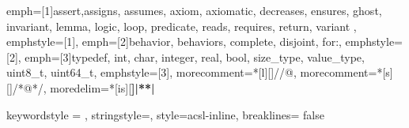 {	emph=[1]{assert,assigns, assumes, axiom, axiomatic, decreases, ensures, ghost, invariant, lemma, logic, loop,
             predicate, reads, requires, return, variant },
	emphstyle=[1]{\bfseries\color{coASCLKeyword}},
	emph=[2]{behavior, behaviors, complete, disjoint, for:},
	emphstyle=[2]{\bfseries\color{coACSLBehavior}},
	emph=[3]{typedef, int, char, integer, real, bool, size_type, value_type, uint8_t,  uint64_t},
	emphstyle=[3]{\bfseries\color{coCKeyword}},
	morecomment=*[l][\color{coASCL}]{//@},
	morecomment=*[s][\color{coASCL}]{/*@}{*/},
	moredelim=*[is][\bfseries]{|*}{*|}
}

{      %
	keywordstyle = \ttfamily\small\color{coASCL},
	stringstyle=\color{coASCL},
	style=acsl-inline,
	breaklines= false
}

